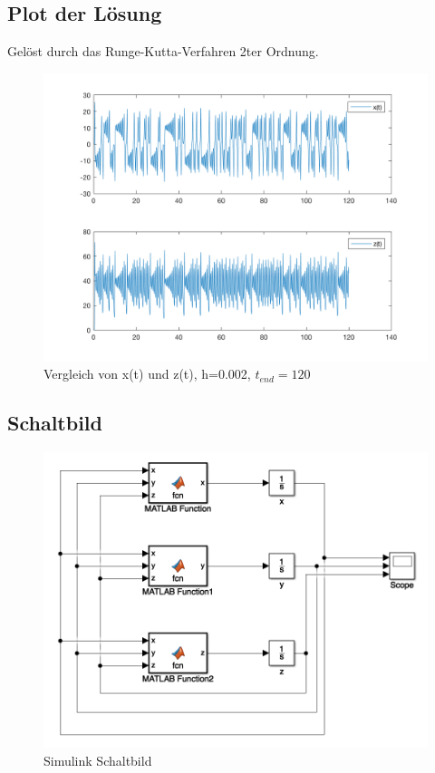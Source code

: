 \documentclass[]{scrartcl}
\begin{document}
\subsection{Plot der Lösung}
Gelöst durch das Runge-Kutta-Verfahren 2ter Ordnung.
\begin{figure}[H]
	\centering
	\includegraphics[width=1\linewidth]{a1_3_1}
	\caption{Vergleich von x(t) und z(t), h=0.002, $t_{end} = 120$}
	\label{fig:a1_3_1}
\end{figure}

\subsection{Schaltbild}
\begin{figure}[H]
	\centering
	\includegraphics[width=1\linewidth]{a1_3_schaltbild}
	\caption{Simulink Schaltbild}
	\label{fig:a1_3_schaltbild}
\end{figure}
\end{document}
